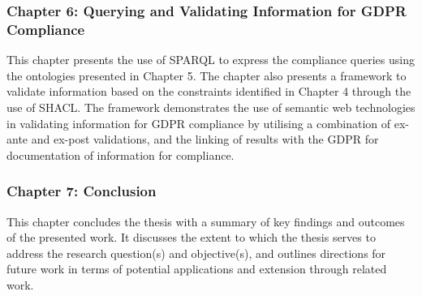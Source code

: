 \subsubsection{Chapter 6: Querying and Validating Information for GDPR Compliance}
This chapter presents the use of SPARQL to express the compliance queries using the ontologies presented in Chapter 5. The chapter also presents a framework to validate information based on the constraints identified in Chapter 4 through the use of SHACL. The framework demonstrates the use of semantic web technologies in validating information for GDPR compliance by utilising a combination of ex-ante and ex-post validations, and the linking of results with the GDPR for documentation of information for compliance.

\subsubsection{Chapter 7: Conclusion}
This chapter concludes the thesis with a summary of key findings and outcomes of the presented work. It discusses the extent to which the thesis serves to address the research question(s) and objective(s), and outlines directions for future work in terms of potential applications and extension through related work.
